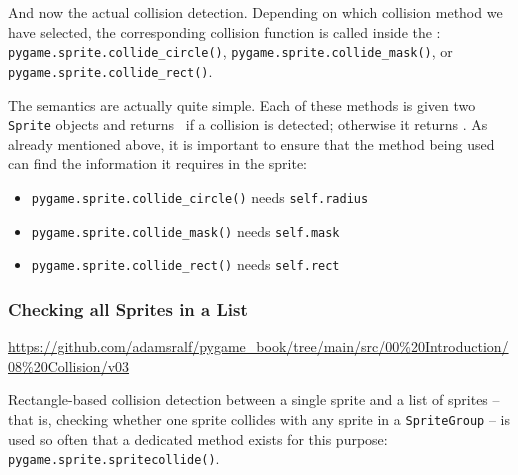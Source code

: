 \begin{hintbox} 
And now the actual collision detection. Depending on which collision method we have selected, the corresponding collision function is called inside the \forSchleife: \texttt{pygame.sprite.col\-lide\-\_circle()},  
\texttt{pygame.sprite.col\-lide\-\_mask()}, or  
\texttt{pygame.sprite.col\-lide\-\_rect()}.  
\end{hintbox}
 
The semantics are actually quite simple. Each of these methods is given two \texttt{Sprite} objects and returns \true\ if a collision is detected; otherwise it returns \false. As already mentioned above, it is important to ensure that the method being used can find the information it requires in the sprite:

\begin{hintbox}
	\begin{itemize}
	    \item \texttt{pygame.sprite.collide\_circle()} needs \texttt{self.radius}
	    \item \texttt{pygame.sprite.collide\_mask()} needs \texttt{self.mask}
	    \item \texttt{pygame.sprite.collide\_rect()} needs \texttt{self.rect}
	\end{itemize}
\end{hintbox}

\newpage
{} 

\subsubsection{Checking all Sprites in a List}
\begin{diskbox}
	\url{https://github.com/adamsralf/pygame_book/tree/main/src/00%20Introduction/08%20Collision/v03}
\end{diskbox}

Rectangle-based collision detection between a single sprite and a list of sprites -- that is, checking whether one sprite collides with any sprite in a \texttt{SpriteGroup} -- is used so often that a dedicated method exists for this purpose: \texttt{pygame.sprite.spritecollide()}.  

